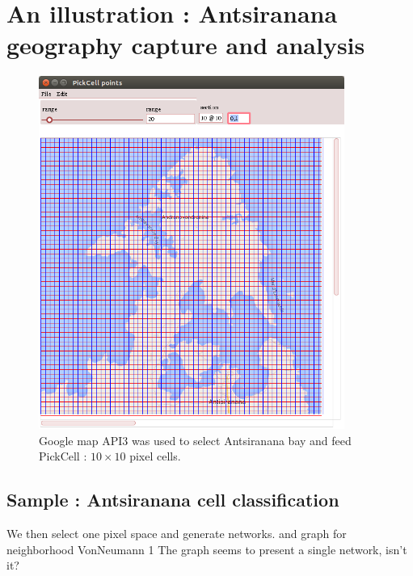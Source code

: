 \section {An illustration :  Antsiranana geography capture and analysis }

\begin{figure}[hbtp]
\begin{center} 
\includegraphics[width=10cm]{diego-split-10x10.png}
\caption{Google map API3 was used to select Antsiranana bay and feed PickCell : $10 \times 10$ pixel cells.}
\label{fif:sampleAntsiranana}
\end{center}
\end{figure}

\subsection {Sample : Antsiranana  cell classification  }

We then select one pixel space and generate networks. and graph for neighborhood VonNeumann 1
The graph seems to present a single network, isn't it?

